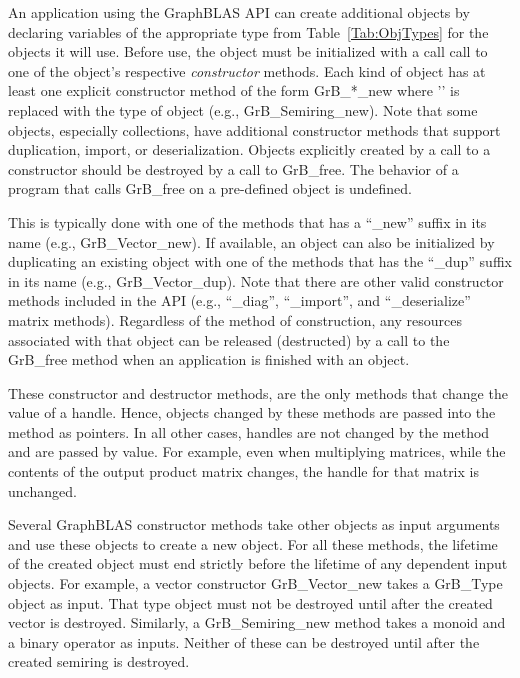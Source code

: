 An application using the GraphBLAS API can create additional objects by
declaring variables of the appropriate type from Table~\ref{Tab:ObjTypes} for 
the objects it will use.  Before use, the object must be initialized 
with a call call to one of the object's respective \emph{constructor} methods.  
Each kind of object has at least one explicit constructor method of the form 
{\sf GrB\_*\_new} where '{\sf *}' is replaced with the type of object (e.g., 
{\sf GrB\_Semiring\_new}). Note that some objects, especially collections, 
have additional constructor methods that support duplication, import, or 
deserialization.  Objects explicitly created by a call to a constructor 
should be destroyed by a call to {\sf GrB\_free}. The behavior of a program
that calls {\sf GrB\_free} on a pre-defined object is undefined.

This is typically done with one of 
the methods that has a ``{\sf \_new}'' suffix in its name (e.g., 
{\sf GrB\_Vector\_new}).  If available, an object can also be initialized by 
duplicating an existing object with one of the methods that has the 
``{\sf \_dup}'' suffix in its name  (e.g., {\sf GrB\_Vector\_dup}).  Note that 
there are other valid constructor methods included in the API (e.g., 
``{\sf \_diag}'', ``{\sf \_import}'', and ``{\sf \_deserialize}'' matrix 
methods).  Regardless of the method of construction, any resources associated 
with that object can be released (destructed) by a call to the {\sf GrB\_free} 
method when an application is finished with an object.    

These constructor and destructor methods, are the only methods that change 
the value of a handle.  Hence, objects changed by these methods are passed
into the method as pointers.  In all other cases, handles are not changed by the 
method and are passed by value.  For example, even when multiplying matrices, 
while the contents of the output product matrix changes, the handle for that 
matrix is unchanged. 

Several GraphBLAS constructor methods take other objects as input arguments
and use these objects to create a new object. For all these
methods, the lifetime of the created object must end strictly before
the lifetime of any dependent input objects. For example, a vector constructor
{\sf GrB\_Vector\_new} takes a {\sf GrB\_Type} object as input. That type
object must not be destroyed until after the created vector is destroyed.
Similarly, a {\sf GrB\_Semiring\_new} method takes a monoid and
a binary operator as inputs. Neither of these can be destroyed until
after the created semiring is destroyed.

